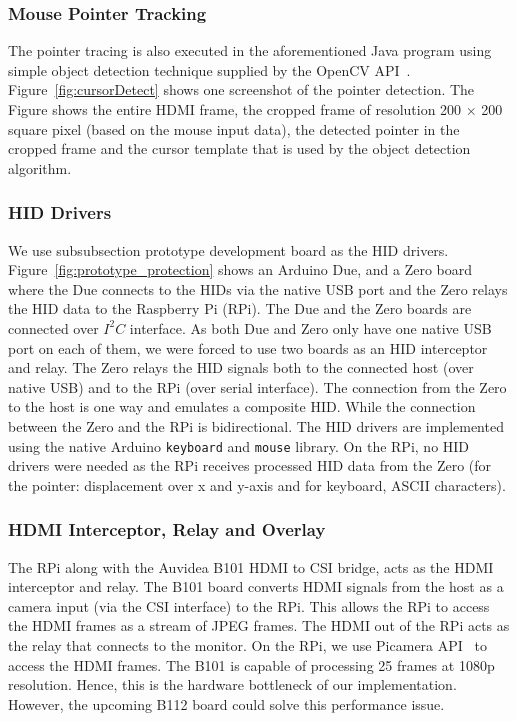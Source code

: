 \subsubsection{Mouse Pointer Tracking}
The pointer tracing is also executed in the aforementioned Java program using simple object detection technique supplied by the OpenCV API~\cite{opencv_template}. Figure~\ref{fig:cursorDetect} shows one screenshot of the pointer detection. The Figure shows the entire HDMI frame, the cropped frame of resolution 200 $\times$ 200 square pixel (based on the mouse input data), the detected pointer in the cropped frame and the cursor template that is used by the object detection algorithm.


\subsubsection{HID Drivers}
We use subsubsection prototype development board as the HID drivers. Figure~\ref{fig:prototype_protection} shows an Arduino Due, and a Zero board where the Due connects to the HIDs via the native USB port and the Zero relays the HID data to the Raspberry Pi (RPi). The Due and the Zero boards are connected over $I^2C$ interface. As both Due and Zero only have one native USB port on each of them, we were forced to use two boards as an HID interceptor and relay. The Zero relays the HID signals both to the connected host (over native USB) and to the RPi (over serial interface). The connection from the Zero to the host is one way and emulates a composite HID. While the connection between the Zero and the RPi is bidirectional. The HID drivers are implemented using the native Arduino \texttt{keyboard} and \texttt{mouse} library. On the RPi, no HID drivers were needed as the RPi receives processed HID data from the Zero (for the pointer: displacement over x and y-axis and for keyboard, ASCII characters).


\subsubsection{HDMI Interceptor, Relay and Overlay}
The RPi along with the Auvidea B101 HDMI to CSI bridge, acts as the HDMI interceptor and relay. The B101 board converts HDMI signals from the host as a camera input (via the CSI interface) to the RPi. This allows the RPi to access the HDMI frames as a stream of JPEG frames. The HDMI out of the RPi acts as the relay that connects to the monitor. On the RPi, we use Picamera API~\cite{picamera} to access the HDMI frames. The B101 is capable of processing 25 frames at 1080p resolution. Hence, this is the hardware bottleneck of our implementation. However, the upcoming B112 board
could solve this performance issue.

